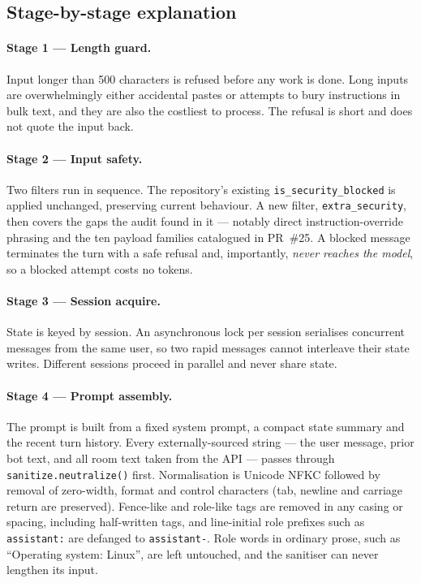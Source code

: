 \documentclass[11pt,a4paper]{article}
\newcommand{\fn}[1]{\texttt{\small #1}}
\begin{document}
\subsection{Stage-by-stage explanation}

\paragraph{Stage 1 --- Length guard.} Input longer than 500 characters is refused before any
work is done. Long inputs are overwhelmingly either accidental pastes or attempts to bury
instructions in bulk text, and they are also the costliest to process. The refusal is short
and does not quote the input back.

\paragraph{Stage 2 --- Input safety.} Two filters run in sequence. The repository's existing
\fn{is\_security\_blocked} is applied unchanged, preserving current behaviour. A new filter,
\fn{extra\_security}, then covers the gaps the audit found in it --- notably direct
instruction-override phrasing and the ten payload families catalogued in PR~\#25. A blocked
message terminates the turn with a safe refusal and, importantly, \emph{never reaches the
model}, so a blocked attempt costs no tokens.

\paragraph{Stage 3 --- Session acquire.} State is keyed by session. An asynchronous lock per
session serialises concurrent messages from the same user, so two rapid messages cannot
interleave their state writes. Different sessions proceed in parallel and never share state.

\paragraph{Stage 4 --- Prompt assembly.} The prompt is built from a fixed system prompt, a
compact state summary and the recent turn history. Every externally-sourced string --- the
user message, prior bot text, and all room text taken from the API --- passes through
\fn{sanitize.neutralize()} first. Normalisation is Unicode NFKC followed by removal of
zero-width, format and control characters (tab, newline and carriage return are preserved).
Fence-like and role-like tags are removed in any casing or spacing, including half-written
tags, and line-initial role prefixes such as \fn{assistant:} are defanged to \fn{assistant-}.
Role words in ordinary prose, such as ``Operating system: Linux'', are left untouched, and the
sanitiser can never lengthen its input.
\end{document}
